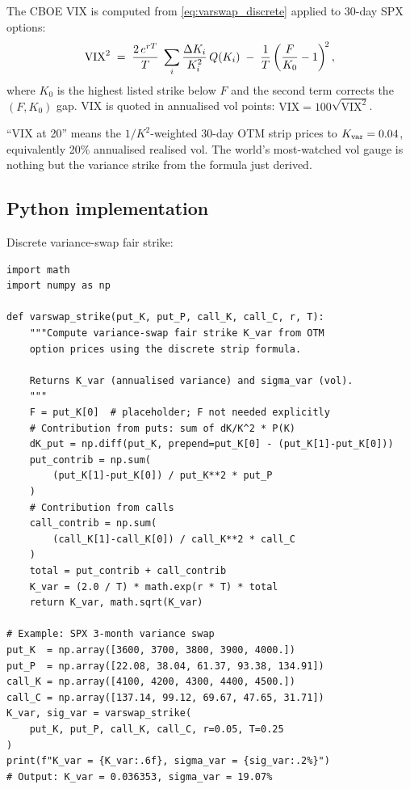 The CBOE VIX is computed from \cref{eq:varswap_discrete} applied to
30-day SPX options:
\[
  \text{VIX}^2
  \;=\;
  \frac{2\,e^{r T}}{T}\;\sum_{i}
    \frac{\Delta K_i}{K_i^2}\,Q(K_i)
  \;-\;
  \frac{1}{T}\left(\frac{F}{K_0} - 1\right)^{\!2},
\]
where $K_0$ is the highest listed strike below $F$ and the second
term corrects the $(F,K_0)$ gap. VIX is quoted in annualised vol
points: $\text{VIX}=100\sqrt{\text{VIX}^2}$.

``VIX at 20'' means the $1/K^2$-weighted 30-day OTM strip prices to
$K_{\text{var}}=0.04$, equivalently 20\% annualised realised
vol. The world's most-watched vol gauge is nothing but the variance
strike from the formula just derived.

\subsection{Python implementation}
\label{subsec:varswap_python}

Discrete variance-swap fair strike:

\begin{lstlisting}[caption={Variance swap fair strike from discrete option prices.},
  label={lst:varswap}]
import math
import numpy as np

def varswap_strike(put_K, put_P, call_K, call_C, r, T):
    """Compute variance-swap fair strike K_var from OTM
    option prices using the discrete strip formula.

    Returns K_var (annualised variance) and sigma_var (vol).
    """
    F = put_K[0]  # placeholder; F not needed explicitly
    # Contribution from puts: sum of dK/K^2 * P(K)
    dK_put = np.diff(put_K, prepend=put_K[0] - (put_K[1]-put_K[0]))
    put_contrib = np.sum(
        (put_K[1]-put_K[0]) / put_K**2 * put_P
    )
    # Contribution from calls
    call_contrib = np.sum(
        (call_K[1]-call_K[0]) / call_K**2 * call_C
    )
    total = put_contrib + call_contrib
    K_var = (2.0 / T) * math.exp(r * T) * total
    return K_var, math.sqrt(K_var)

# Example: SPX 3-month variance swap
put_K  = np.array([3600, 3700, 3800, 3900, 4000.])
put_P  = np.array([22.08, 38.04, 61.37, 93.38, 134.91])
call_K = np.array([4100, 4200, 4300, 4400, 4500.])
call_C = np.array([137.14, 99.12, 69.67, 47.65, 31.71])
K_var, sig_var = varswap_strike(
    put_K, put_P, call_K, call_C, r=0.05, T=0.25
)
print(f"K_var = {K_var:.6f}, sigma_var = {sig_var:.2%}")
# Output: K_var = 0.036353, sigma_var = 19.07%
\end{lstlisting}


